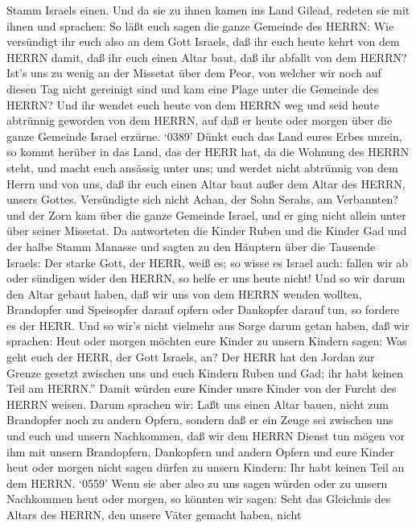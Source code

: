 Stamm Israels einen.  Und da sie zu ihnen kamen ins Land
Gilead, redeten sie mit ihnen und sprachen:  So läßt euch
sagen die ganze Gemeinde des HERRN: Wie versündigt ihr euch also an dem
Gott Israels, daß ihr euch heute kehrt von dem HERRN damit, daß ihr euch
einen Altar baut, daß ihr abfallt von dem HERRN?  Ist's uns
zu wenig an der Missetat über dem Peor, von welcher wir noch auf diesen
Tag nicht gereinigt sind und kam eine Plage unter die Gemeinde des
HERRN?  Und ihr wendet euch heute von dem HERRN weg und
seid heute abtrünnig geworden von dem HERRN, auf daß er heute oder
morgen über die ganze Gemeinde Israel erzürne.  `0389'
Dünkt euch das Land eures Erbes unrein, so kommt herüber in das Land,
das der HERR hat, da die Wohnung des HERRN steht, und macht euch
ansässig unter uns; und werdet nicht abtrünnig von dem Herrn und von
uns, daß ihr euch einen Altar baut außer dem Altar des HERRN, unsers
Gottes.  Versündigte sich nicht Achan, der Sohn Serahs, am
Verbannten? und der Zorn kam über die ganze Gemeinde Israel, und er ging
nicht allein unter über seiner Missetat.  Da antworteten
die Kinder Ruben und die Kinder Gad und der halbe Stamm Manasse und
sagten zu den Häuptern über die Tausende Israels:  Der
starke Gott, der HERR, weiß es; so wisse es Israel auch: fallen wir ab
oder sündigen wider den HERRN, so helfe er uns heute nicht!
 Und so wir darum den Altar gebaut haben, daß wir uns von
dem HERRN wenden wollten, Brandopfer und Speisopfer darauf opfern oder
Dankopfer darauf tun, so fordere es der HERR.  Und so wir's
nicht vielmehr aus Sorge darum getan haben, daß wir sprachen: Heut oder
morgen möchten eure Kinder zu unsern Kindern sagen: Was geht euch der
HERR, der Gott Israels, an?  Der HERR hat den Jordan zur
Grenze gesetzt zwischen uns und euch Kindern Ruben und Gad; ihr habt
keinen Teil am HERRN.'' Damit würden eure Kinder unsre Kinder von der
Furcht des HERRN weisen.  Darum sprachen wir: Laßt uns
einen Altar bauen, nicht zum Brandopfer noch zu andern Opfern,
 sondern daß er ein Zeuge sei zwischen uns und euch und
unsern Nachkommen, daß wir dem HERRN Dienst tun mögen vor ihm mit unsern
Brandopfern, Dankopfern und andern Opfern und eure Kinder heut oder
morgen nicht sagen dürfen zu unsern Kindern: Ihr habt keinen Teil an dem
HERRN.  `0559' Wenn sie aber also zu uns sagen würden oder
zu unsern Nachkommen heut oder morgen, so könnten wir sagen: Seht das
Gleichnis des Altars des HERRN, den unsere Väter gemacht haben, nicht
